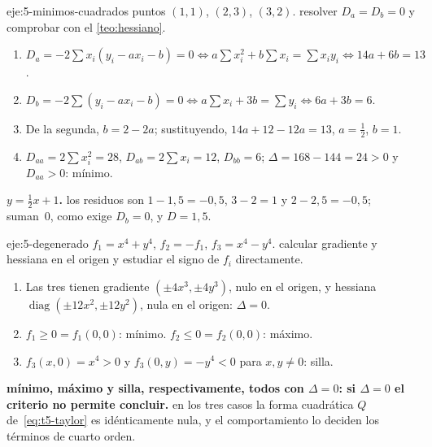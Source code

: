 \begin{solucion}{eje:5-minimos-cuadrados}
\datos puntos $(1,1)$, $(2,3)$, $(3,2)$.
\planteamiento resolver $D_a=D_b=0$ y comprobar con el \cref{teo:hessiano}.
\pasos
\begin{enumerate}[label=\arabic*.]
  \item $D_a=-2\sum x_i(y_i-ax_i-b)=0\iff a\sum x_i^2+b\sum x_i=\sum x_iy_i\iff14a+6b=13$.
  \item $D_b=-2\sum(y_i-ax_i-b)=0\iff a\sum x_i+3b=\sum y_i\iff6a+3b=6$.
  \item De la segunda, $b=2-2a$; sustituyendo, $14a+12-12a=13$, $a=\frac12$, $b=1$.
  \item $D_{aa}=2\sum x_i^2=28$, $D_{ab}=2\sum x_i=12$, $D_{bb}=6$; $\Delta=168-144=24>0$ y $D_{aa}>0$: mínimo.
\end{enumerate}
\resultado \textbf{$y=\frac12x+1$.}
\comprobacion los residuos son $1-1{,}5=-0{,}5$, $3-2=1$ y $2-2{,}5=-0{,}5$; suman~0, como exige $D_b=0$, y $D=1{,}5$.
\end{solucion}

\begin{solucion}{eje:5-degenerado}
\datos $f_1=x^4+y^4$, $f_2=-f_1$, $f_3=x^4-y^4$.
\planteamiento calcular gradiente y hessiana en el origen y estudiar el signo de $f_i$ directamente.
\pasos
\begin{enumerate}[label=\arabic*.]
  \item Las tres tienen gradiente $(\pm4x^3,\pm4y^3)$, nulo en el origen, y hessiana $\operatorname{diag}(\pm12x^2,\pm12y^2)$, nula en el origen: $\Delta=0$.
  \item $f_1\ge0=f_1(0,0)$: mínimo. $f_2\le0=f_2(0,0)$: máximo.
  \item $f_3(x,0)=x^4>0$ y $f_3(0,y)=-y^4<0$ para $x,y\neq0$: silla.
\end{enumerate}
\resultado \textbf{mínimo, máximo y silla, respectivamente, todos con $\Delta=0$: si $\Delta=0$ el criterio no permite concluir.}
\comprobacion en los tres casos la forma cuadrática $Q$ de~\eqref{eq:t5-taylor} es idénticamente nula, y el comportamiento lo deciden los términos de cuarto orden.
\end{solucion}

